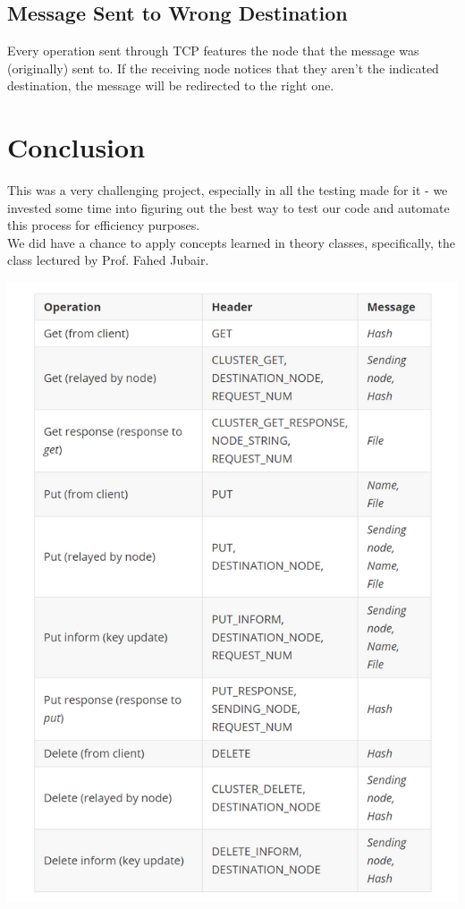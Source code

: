 \documentclass{article}
\begin{document}
\begin{multicols}{2}
    \subsection{Message Sent to Wrong Destination}
    Every operation sent through TCP features the node that the message was (originally) sent to. If the receiving node notices that they aren't the indicated destination, the message will be redirected to the right one.
    
	\section{Conclusion}
	This was a very challenging project, especially in all the testing made for it - we invested some time into figuring out the best way to test our code and automate this process for efficiency purposes. \\
	
    We did have a chance to apply concepts learned in theory classes, specifically, the class lectured by Prof. Fahed Jubair.
    \end{multicols}
    \includegraphics{tabela.png}
\end{document}
